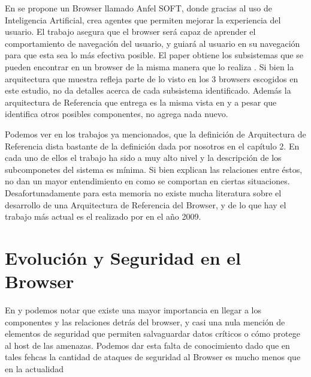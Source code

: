 En \cite{Lwin2009} se propone un Browser llamado Anfel SOFT, donde gracias al uso de Inteligencia Artificial, crea agentes que permiten mejorar la experiencia del usuario. El trabajo asegura que el browser será capaz de aprender el comportamiento de navegación del usuario, y guiará al usuario en su navegación para que esta sea lo más efectiva posible. El paper obtiene los subsistemas que se pueden encontrar en un browser de la misma manera que lo realiza \cite{2005-grosskurth-browser-refarch}. Si bien la arquitectura que muestra refleja parte de lo visto en los 3 browsers escogidos en este estudio, no da detalles acerca de cada subsistema identificado. Además la arquitectura de Referencia que entrega es la misma vista en \cite{2005-grosskurth-browser-refarch, preprint-grosskurth-browser-archevol} y a pesar que identifica otros posibles componentes, no agrega nada nuevo.

Podemos ver en los trabajos ya mencionados, que la definición de Arquitectura de Referencia dista bastante de la definición dada por nosotros en el capítulo 2. En cada uno de ellos el trabajo ha sido a muy alto nivel y la descripción de los subcomponetes del sistema es mínima. Si bien explican las relaciones entre éstos, no dan un mayor entendimiento en como se comportan en ciertas situaciones. Desafortunadamente para esta memoria no existe mucha literatura sobre el desarrollo de una Arquitectura de Referencia del Browser, y de lo que hay el trabajo más actual es el realizado por \cite{Lwin2009} en el año 2009.


\section{Evolución y Seguridad en el Browser}
\label{chap3:EvoandSec}

En \cite{2005-grosskurth-browser-refarch} y \cite{preprint-grosskurth-browser-archevol} podemos notar que existe una mayor importancia en llegar a los componentes y las relaciones detrás del browser, y casi una nula mención de elementos de seguridad que permiten salvaguardar datos críticos o cómo protege al host de las amenazas. Podemos dar esta falta de conocimiento dado que en tales fehcas la cantidad de ataques de seguridad al Browser es mucho menos que en la actualidad %


